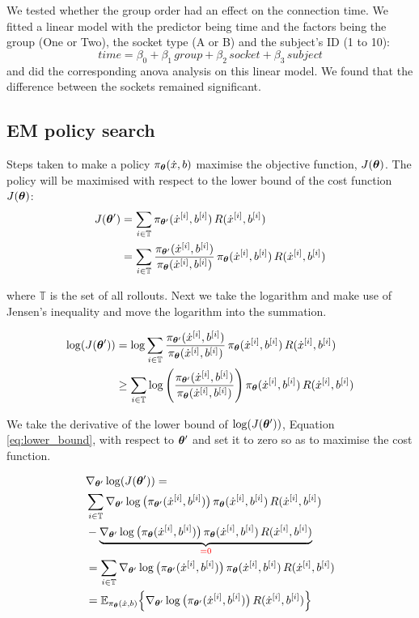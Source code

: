 We tested whether the group order had an effect on the connection time. We fitted a linear model
with the predictor being time and the factors being the group (One or Two), the socket type (A or B) 
and the subject's ID (1 to 10):
\begin{equation}
 time = \beta_0 + \beta_1\, group + \beta_2\, socket + \beta_3\, subject
\end{equation}
and did the corresponding anova analysis on this linear model. We found that the difference between the sockets 
remained significant.

\subsection{EM policy search}\label{app:lb}
Steps taken to make a policy $\pi_{\boldsymbol{\theta}}(\dot{x},b)$ maximise the objective function, $J(\boldsymbol{\theta})$.
The policy will be maximised with respect to the lower bound of the cost function $J(\boldsymbol{\theta})$:
\begin{align}
  J(\boldsymbol{\theta}') &= \sum_{i \in \mathbb{T}} \pi_{\boldsymbol{\theta}'}(\dot{x}^{[i]},b^{[i]})\, R(\dot{x}^{[i]},b^{[i]}) \nonumber\\ 
	   &= \sum_{i \in \mathbb{T}}  \frac{\pi_{\boldsymbol{\theta}'}(\dot{x}^{[i]},b^{[i]})}{\pi_{\boldsymbol{\theta}}(\dot{x}^{[i]},b^{[i]})} \, \pi_{\boldsymbol{\theta}}(\dot{x}^{[i]},b^{[i]}) \, R(\dot{x}^{[i]},b^{[i]})
\end{align}

where $\mathbb{T}$ is the set of all rollouts. Next we take the logarithm and make use of Jensen's inequality and move the logarithm into the 
summation.

\begin{align}
  \log( J(\boldsymbol{\theta}') )  &= \log \sum_{i \in \mathbb{T}} \frac{\pi_{\boldsymbol{\theta}'}(\dot{x}^{[i]},b^{[i]})}{\pi_{\boldsymbol{\theta}}(\dot{x}^{[i]},b^{[i]})} \, \pi_{\boldsymbol{\theta}}(\dot{x}^{[i]},b^{[i]}) \, R(\dot{x}^{[i]},b^{[i]}) \nonumber \\
		     & \geq \sum_{i \in \mathbb{T}}\log\Bigg( \frac{\pi_{\boldsymbol{\theta}'}(\dot{x}^{[i]},b^{[i]})}{\pi_{\boldsymbol{\theta}}(\dot{x}^{[i]},b^{[i]})}\Bigg) \, \pi_{\boldsymbol{\theta}}(\dot{x}^{[i]},b^{[i]}) \, R(\dot{x}^{[i]},b^{[i]}) \label{eq:lower_bound}
\end{align}

We take the derivative of the lower bound of $\log(J(\boldsymbol{\theta}'))$, Equation \ref{eq:lower_bound}, with respect to $\boldsymbol{\theta}'$ and set it to 
zero so as to maximise the cost function.

\begin{align}
 &\nabla_{\boldsymbol{\theta}'}  \log( J(\boldsymbol{\theta}') ) = \nonumber\\
 &\sum_{i \in \mathbb{T}} \nabla_{\boldsymbol{\theta}'} \log\big( \pi_{\boldsymbol{\theta}'}(\dot{x}^{[i]},b^{[i]})\big) \, \pi_{\boldsymbol{\theta}}(\dot{x}^{[i]},b^{[i]}) \, R(\dot{x}^{[i]},b^{[i]}) \nonumber \\
				    & - \underbrace{ \nabla_{\boldsymbol{\theta}'} \log\big( \pi_{\boldsymbol{\theta}}(\dot{x}^{[i]},b^{[i]})\big) \, \pi_{\boldsymbol{\theta}}(\dot{x}^{[i]},b^{[i]}) \, R(\dot{x}^{[i]},b^{[i]})}_{\color{red} =0} \nonumber \\
				    &= \sum_{i \in \mathbb{T}} \nabla_{\boldsymbol{\theta}'} \log\big( \pi_{\boldsymbol{\theta}'}(\dot{x}^{[i]},b^{[i]})\big) \, \pi_{\boldsymbol{\theta}}(\dot{x}^{[i]},b^{[i]}) \, R(\dot{x}^{[i]},b^{[i]}) \nonumber \\
				    &= \mathbb{E}_{\pi_{\boldsymbol{\theta}}(\dot{x},b)} \Big\{ \nabla_{\boldsymbol{\theta}'} \log\big( \pi_{\boldsymbol{\theta}'}(\dot{x}^{[i]},b^{[i]})\big)\, R(\dot{x}^{[i]},b^{[i]}) \Big\}
\end{align}


